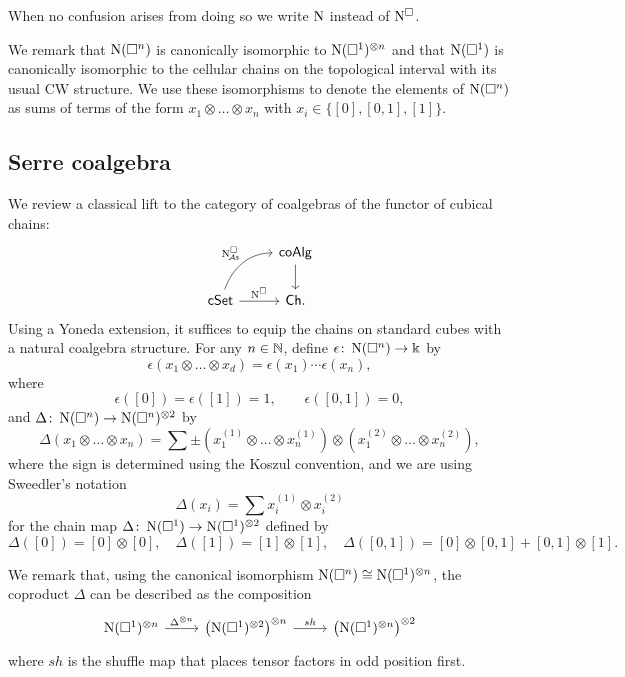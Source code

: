 When no confusion arises from doing so we write $\operatorname{N}$ instead of $\operatorname{N^{\square}}$.

We remark that $\operatorname{N}(\square^n)$ is canonically isomorphic to $\operatorname{N}(\square^1)^{\otimes n}$ and that $\operatorname{N}(\square^1)$ is canonically isomorphic to the cellular chains on the topological interval with its usual CW structure.
We use these isomorphisms to denote the elements of $\operatorname{N}(\square^n)$ as sums of terms of the form $x_1 \otimes \dots \otimes x_n$ with $x_i \in \big\{[0], [0,1], [1] \big\}$.

\subsection{Serre coalgebra} \label{ss:serre coalgebra}

We review a classical lift to the category of coalgebras of the functor of cubical chains:
\[
\begin{tikzcd}
& \coAlg \arrow[d] \\
\cSet \arrow[r, "\cchains"] \arrow[ur, "\cchainsA", out=70, in=180] & \Ch.
\end{tikzcd}
\]
Using a Yoneda extension, it suffices to equip the chains on standard cubes with a natural coalgebra structure.
For any $n \in \mathbb{N}$, define $\epsilon \colon \operatorname{N}(\square^n) \to \Bbbk$ by
\[
\epsilon \left( x_1 \otimes \dots \otimes x_d \right) = \epsilon(x_1) \dotsm \epsilon(x_n),
\]
where
\[
\epsilon([0]) = \epsilon([1]) = 1, \qquad \epsilon([0, 1]) = 0,
\]
and $\Delta \colon \operatorname{N}(\square^n) \to \operatorname{N}(\square^n)^{\otimes 2}$ by
\[
\Delta (x_1 \otimes \dots \otimes x_n) =
\sum \pm \left( x_1^{(1)} \otimes \dots \otimes x_n^{(1)} \right) \otimes
\left( x_1^{(2)} \otimes \dots \otimes x_n^{(2)} \right),
\]
where the sign is determined using the Koszul convention, and we are using Sweedler's notation
\[
\Delta(x_i) = \sum x_i^{(1)} \otimes x_i^{(2)}
\]
for the chain map $\Delta \colon \operatorname{N}(\square^1) \to \operatorname{N}(\square^1)^{\otimes 2}$ defined by
\[
\Delta([0]) = [0] \otimes [0], \quad \Delta([1]) = [1] \otimes [1], \quad \Delta([0,1]) = [0] \otimes [0,1] + [0,1] \otimes [1].
\]

We remark that, using the canonical isomorphism $\operatorname{N}(\square^n) \cong \operatorname{N}(\square^1)^{\otimes n}$, the coproduct $\Delta$ can be described as the composition
\[
\begin{tikzcd}
\chains(\cube^1)^{\otimes n} \arrow[r, "\Delta^{\otimes n}"] & \left( \chains(\cube^1)^{\otimes 2} \right)^{\otimes n} \arrow[r, "sh"] & \left( \chains(\cube^1)^{\otimes n} \right)^{\otimes 2}
\end{tikzcd}
\]
where $sh$ is the shuffle map that places tensor factors in odd position first.

